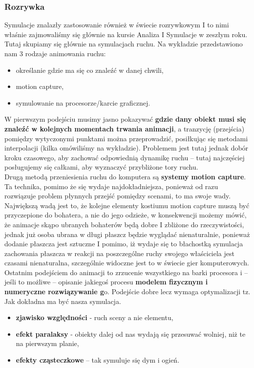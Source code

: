 \subsubsection{Rozrywka}

Symulacje znalazły zastosowanie również w świecie rozrywkowym I to nimi właśnie zajmowaliśmy się głównie na kursie Analiza I Symulacje w zeszłym roku. Tutaj skupiamy się głównie na symulacjach ruchu. Na wykładzie przedstawiono nam 3 rodzaje animowania ruchu:

\begin{itemize}
	\item określanie gdzie ma się co znaleźć w danej chwili,
	\item motion capture,
	\item symulowanie na procesorze/karcie graficznej. \\
\end{itemize}

W pierwszym podejściu musimy jasno pokazywać \textbf{gdzie dany obiekt musi się znaleźć w kolejnych momentach trwania animacji}, a tranzycję (przejścia) pomiędzy wytyczonymi punktami można przeprowadzić, posiłkując się metodami interpolacji (kilka omówiliśmy na wykładzie). Problemem jest tutaj jednak dobór kroku czasowego, aby zachować odpowiednią dynamikę ruchu – tutaj najczęściej posługujemy się całkami, aby wyznaczyć przybliżone tory ruchu. \\

Drugą metodą przeniesienia ruchu do komputera są \textbf{systemy motion capture}. Ta technika, pomimo że się wydaje najdokładniejsza, ponieważ od razu rozwiązuje problem płynnych przejść pomiędzy scenami, to ma swoje wady. Największą wadą jest to, że kolejne elementy kostiumu motion capture muszą być przyczepione do bohatera, a nie do jego odzieże, w konsekwencji możemy mówić, że animacje skąpo ubranych bohaterów będą dobre I zbliżone do rzeczywistości, jednak już osoba ubrana w długi płaszcz będzie wyglądać nienaturalnie, ponieważ dodanie płaszcza jest sztuczne I pomimo, iż wydaje się to błachostką symulacja zachowania płaszcza w reakcji na poszczególne ruchy swojego właściciela jest czasami nienaturalna, szczególnie widoczne jest to w świecie gier komputerowych.\\

Ostatnim podejściem do animacji to zrzucenie wszystkiego na barki procesora i – jeśli to możliwe – opisanie jakiegoś procesu \textbf{modelem fizycznym i numeryczne rozwiązywanie g}o. Podejście dobre lecz wymaga optymalizacji tz. Jak dokładna ma być nasza symulacja. \\

\begin{itemize}
	\item \textbf{zjawisko względności} - ruch sceny a nie elementu,
	\item \textbf{efekt paralaksy} - obiekty dalej od nas wydają się przesuwać wolniej, niż te na pierwszym planie,
	\item \textbf{efekty cząsteczkowe} – tak symuluje się dym i ogień.
\end{itemize}
